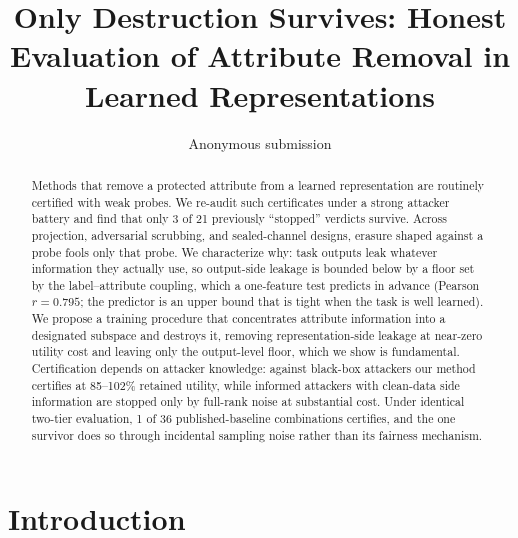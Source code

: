 \documentclass[letterpaper]{article} %
\title{Only Destruction Survives: Honest Evaluation of Attribute Removal in Learned Representations}
\author{Anonymous submission}
\begin{document}
\maketitle

\begin{abstract}
Methods that remove a protected attribute from a learned representation are routinely certified with weak probes. We re-audit such certificates under a strong attacker battery and find that only 3 of 21 previously ``stopped'' verdicts survive. Across projection, adversarial scrubbing, and sealed-channel designs, erasure shaped against a probe fools only that probe. We characterize why: task outputs leak whatever information they actually use, so output-side leakage is bounded below by a floor set by the label--attribute coupling, which a one-feature test predicts in advance (Pearson $r=0.795$; the predictor is an upper bound that is tight when the task is well learned). We propose a training procedure that concentrates attribute information into a designated subspace and destroys it, removing representation-side leakage at near-zero utility cost and leaving only the output-level floor, which we show is fundamental. Certification depends on attacker knowledge: against black-box attackers our method certifies at 85--102\% retained utility, while informed attackers with clean-data side information are stopped only by full-rank noise at substantial cost. Under identical two-tier evaluation, 1 of 36 published-baseline combinations certifies, and the one survivor does so through incidental sampling noise rather than its fairness mechanism.
\end{abstract}

\section{Introduction}
\end{document}
